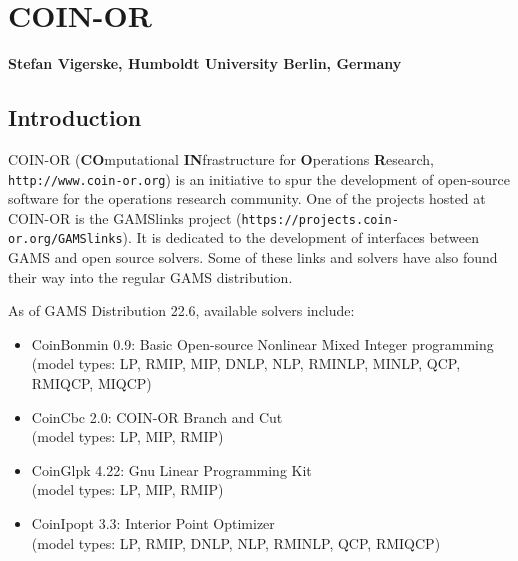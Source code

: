 \renewenvironment{option_tabular}%
{\begin{tabular}{p{.16\textwidth}p{.65\textwidth}p{.11\textwidth}}
\hline
\textbf{Option}      &
\textbf{Description} &
\textbf{Default}     \\
\hline}
{\end{tabular}}

\renewenvironment{tab_list}[1]%
{\begin{list}{}{\vspace*{-1.5ex}\renewcommand{\makelabel}{\desclabel}\parsep-0.15cm\labelwidth#1\leftmargin#1\setlength{\labelsep}{\itemindent}\topsep0cm\parskip0cm\partopsep0cm}}%
{\end{list}}


\chapter{COIN-OR}
\textbf{Stefan Vigerske, Humboldt University Berlin, Germany}
\vspace{1cm}

\minitoc


\section{Introduction}

COIN-OR (\textbf{CO}mputational \textbf{IN}frastructure for \textbf{O}perations \textbf{R}esearch, \texttt{http://www.coin-or.org}) is an initiative to spur the development of open-source software for the operations research community.
One of the projects hosted at COIN-OR is the GAMSlinks project (\texttt{https://projects.coin-or.org/GAMSlinks}).
It is dedicated to the development of interfaces between GAMS and open source solvers.
Some of these links and solvers have also found their way into the regular GAMS distribution.

As of GAMS Distribution 22.6, available solvers include:
\begin{itemize}
\item CoinBonmin 0.9: Basic Open-source Nonlinear Mixed Integer programming\\
(model types: LP, RMIP, MIP, DNLP, NLP, RMINLP, MINLP, QCP, RMIQCP, MIQCP)
\item CoinCbc 2.0: COIN-OR Branch and Cut\\
(model types: LP, MIP, RMIP)
\item CoinGlpk 4.22: Gnu Linear Programming Kit\\
(model types: LP, MIP, RMIP)
\item CoinIpopt 3.3: Interior Point Optimizer\\
(model types: LP, RMIP, DNLP, NLP, RMINLP, QCP, RMIQCP)
\end{itemize}

